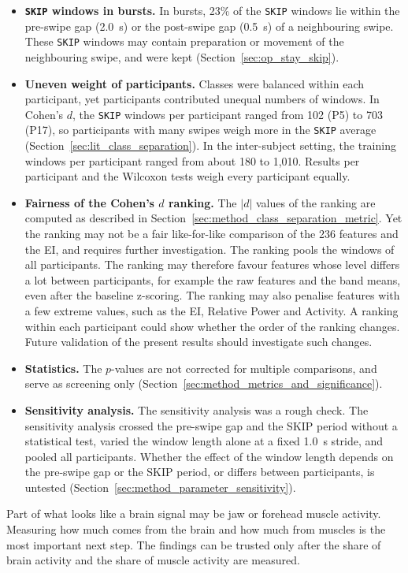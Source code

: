 \documentclass[12pt,a4paper]{report}
\begin{document}
\begin{itemize}
    \item \textbf{\texttt{SKIP} windows in bursts.} In bursts, 23\% of the \texttt{SKIP} windows lie within the pre-swipe gap (2.0~s) or the post-swipe gap (0.5~s) of a neighbouring swipe. These \texttt{SKIP} windows may contain preparation or movement of the neighbouring swipe, and were kept (Section~\ref{sec:op_stay_skip}).
    \item \textbf{Uneven weight of participants.} Classes were balanced within each participant, yet participants contributed unequal numbers of windows. In Cohen's \(d\), the \texttt{SKIP} windows per participant ranged from 102 (P5) to 703 (P17), so participants with many swipes weigh more in the \texttt{SKIP} average (Section~\ref{sec:lit_class_separation}). In the inter-subject setting, the training windows per participant ranged from about 180 to 1,010. Results per participant and the Wilcoxon tests weigh every participant equally.
    \item \textbf{Fairness of the Cohen's \(d\) ranking.} The \(|d|\) values of the ranking are computed as described in Section~\ref{sec:method_class_separation_metric}. Yet the ranking may not be a fair like-for-like comparison of the 236 features and the EI, and requires further investigation. The ranking pools the windows of all participants. The ranking may therefore favour features whose level differs a lot between participants, for example the raw features and the band means, even after the baseline z-scoring. The ranking may also penalise features with a few extreme values, such as the EI, Relative Power and Activity. A ranking within each participant could show whether the order of the ranking changes. Future validation of the present results should investigate such changes.
    \item \textbf{Statistics.} The \(p\)-values are not corrected for multiple comparisons, and serve as screening only (Section~\ref{sec:method_metrics_and_significance}).
    \item \textbf{Sensitivity analysis.} The sensitivity analysis was a rough check. The sensitivity analysis crossed the pre-swipe gap and the SKIP period without a statistical test, varied the window length alone at a fixed 1.0~s stride, and pooled all participants. Whether the effect of the window length depends on the pre-swipe gap or the SKIP period, or differs between participants, is untested (Section~\ref{sec:method_parameter_sensitivity}).
\end{itemize}
Part of what looks like a brain signal may be jaw or forehead muscle activity. Measuring how much comes from the brain and how much from muscles is the most important next step. The findings can be trusted only after the share of brain activity and the share of muscle activity are measured.
\end{document}

